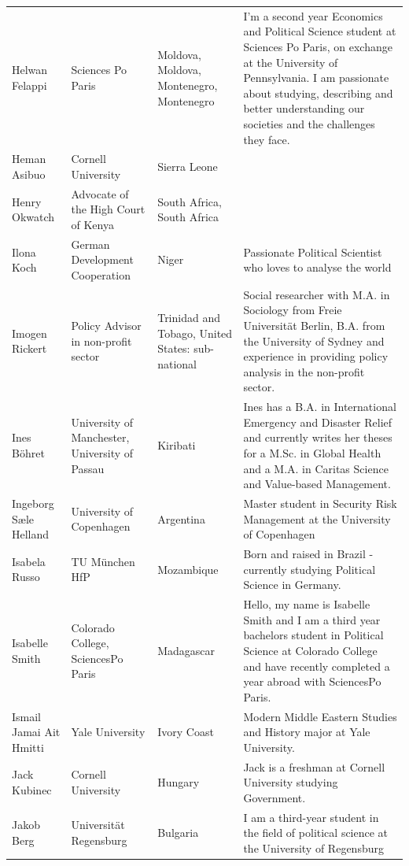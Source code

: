 \documentclass[
]{article}
\begin{document}
\begin{longtable}[t]{l>{\raggedright\arraybackslash}p{2cm}>{\raggedright\arraybackslash}p{2cm}>{\raggedright\arraybackslash}p{3cm}}
\addlinespace
\rowcolor{gray!6}  Helwan Felappi & Sciences Po Paris & Moldova, Moldova, Montenegro, Montenegro & I'm a second year Economics and Political Science student at Sciences Po Paris, on exchange at the University of Pennsylvania. I am passionate about studying, describing and better understanding our societies and the challenges they face.\\
Heman Asibuo & Cornell University & Sierra Leone & \\
\rowcolor{gray!6}  Henry Okwatch & Advocate of the High Court of Kenya & South Africa, South Africa & \\
Ilona Koch & German Development Cooperation & Niger & Passionate Political Scientist who loves to analyse the world\\
\rowcolor{gray!6}  Imogen Rickert & Policy Advisor in non-profit sector & Trinidad and Tobago, United States: sub-national & Social researcher with M.A. in Sociology from Freie Universität Berlin, B.A. from the University of Sydney and experience in providing policy analysis in the non-profit sector.\\
\addlinespace
Ines Böhret & University of Manchester, University of Passau & Kiribati & Ines has a B.A. in International Emergency and Disaster Relief and currently writes her theses for a M.Sc. in Global Health and a M.A. in Caritas Science and Value-based Management.\\
\rowcolor{gray!6}  Ingeborg Sæle Helland & University of Copenhagen & Argentina & Master student in Security Risk Management at the University of Copenhagen\\
Isabela Russo & TU München HfP & Mozambique & Born and raised in Brazil - currently studying Political Science in Germany.\\
\rowcolor{gray!6}  Isabelle Smith & Colorado College, SciencesPo Paris & Madagascar & Hello, my name is Isabelle Smith and I am a third year bachelors student in Political Science at Colorado College and have recently completed a year abroad with SciencesPo Paris.\\
Ismail Jamai Ait Hmitti & Yale University & Ivory Coast & Modern Middle Eastern Studies and History major at Yale University.\\
\addlinespace
\rowcolor{gray!6}  Jack Kubinec & Cornell University & Hungary & Jack is a freshman at Cornell University studying Government.\\
Jakob Berg & Universität Regensburg & Bulgaria & I am a third-year student in the field of political science at the University of Regensburg\\

\end{longtable}
\end{document}
